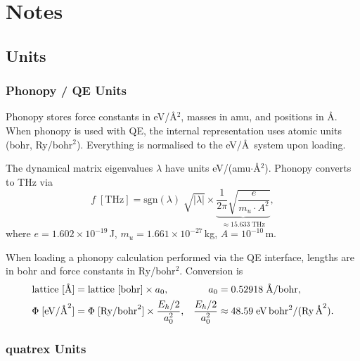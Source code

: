\chapter{Notes}
\label{ch:notes}

\section{Units}
\label{sec:units}


\subsection{Phonopy / QE Units}
\label{sec:phonopy_units}

Phonopy stores force constants in eV/\AA$^2$, masses in amu, and
positions in \AA.  When phonopy is used with QE, the internal representation
uses atomic units (bohr, Ry/bohr$^2$).  Everything is normalised to the
eV/\AA\ system upon loading.

The dynamical matrix eigenvalues $\lambda$ have units
eV/(amu$\cdot$\AA$^2$).  Phonopy converts to THz via
\begin{equation}\label{eq:VaspToTHz}
  f\;[\text{THz}]
  = \mathrm{sgn}(\lambda)\;\sqrt{|\lambda|}
    \times \underbrace{
      \frac{1}{2\pi}\sqrt{\frac{e}{m_u \cdot A^2}}
    }_{\displaystyle \approx 15.633\;\text{THz}},
\end{equation}
where $e = 1.602\times10^{-19}$\,J, $m_u = 1.661\times10^{-27}$\,kg,
$A = 10^{-10}$\,m.

When loading a phonopy calculation performed via the QE interface,
lengths are in bohr and force constants in Ry/bohr$^2$. Conversion is
\begin{align}
  \text{lattice [}\text{\AA}\text{]}
    &= \text{lattice [bohr]} \times a_0,
    &a_0 &= 0.52918\;\text{\AA/bohr}, \\
  \Phi\;[\text{eV/\AA}^2]
    &= \Phi\;[\text{Ry/bohr}^2] \times \frac{E_h/2}{a_0^2},
    &\frac{E_h/2}{a_0^2} &\approx 48.59\;\text{eV\,bohr}^2\text{/(Ry\,\AA}^2).
\end{align}


\subsection{quatrex Units}
\label{sec:solver_units}

